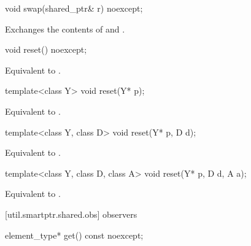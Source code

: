 %
\begin{itemdecl}
void swap(shared_ptr& r) noexcept;
\end{itemdecl}

\begin{itemdescr}

\pnum\effects  Exchanges the contents of  and .
\end{itemdescr}

%
\begin{itemdecl}
void reset() noexcept;
\end{itemdecl}

\begin{itemdescr}
\pnum\effects  Equivalent to .
\end{itemdescr}

%
\begin{itemdecl}
template<class Y> void reset(Y* p);
\end{itemdecl}

\begin{itemdescr}
\pnum\effects  Equivalent to .
\end{itemdescr}

%
\begin{itemdecl}
template<class Y, class D> void reset(Y* p, D d);
\end{itemdecl}

\begin{itemdescr}
\pnum\effects  Equivalent to .
\end{itemdescr}

%
\begin{itemdecl}
template<class Y, class D, class A> void reset(Y* p, D d, A a);
\end{itemdecl}

\begin{itemdescr}
\pnum
\effects  Equivalent to .
\end{itemdescr}

[util.smartptr.shared.obs]{ observers}
%
\begin{itemdecl}
element_type* get() const noexcept;
\end{itemdecl}

